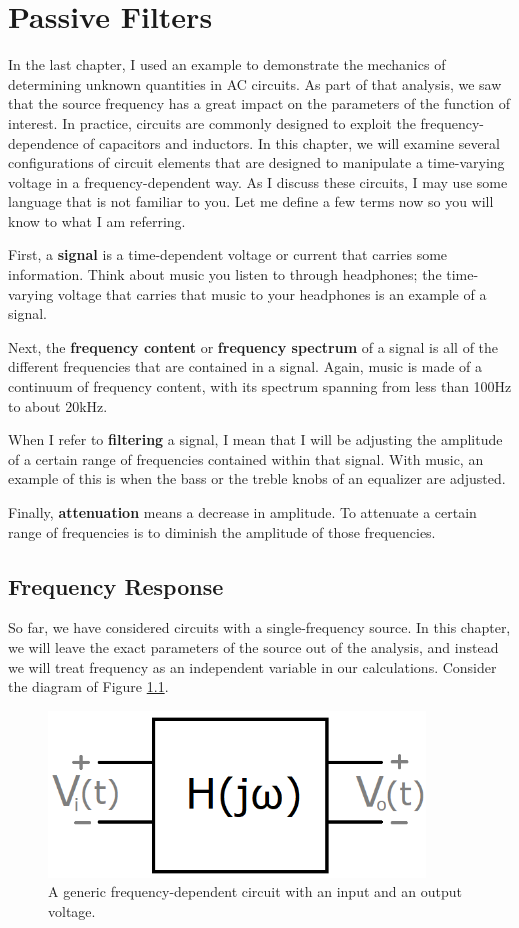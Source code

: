 \chapter{Passive Filters}
In the last chapter, I used an example to demonstrate the mechanics of determining unknown quantities in AC circuits. As part of that analysis, we saw that the source frequency has a great impact on the parameters of the function of interest. In practice, circuits are commonly designed to exploit the frequency-dependence of capacitors and inductors. In this chapter, we will examine several configurations of circuit elements that are designed to manipulate a time-varying voltage in a frequency-dependent way. As I discuss these circuits, I may use some language that is not familiar to you. Let me define a few terms now so you will know to what I am referring. 
\par
First, a \textbf{signal} is a time-dependent voltage or current that carries some information. Think about music you listen to through headphones; the time-varying voltage that carries that music to your headphones is an example of a signal.
\par
Next, the \textbf{frequency content} or \textbf{frequency spectrum} of a signal is all of the different frequencies that are contained in a signal. Again, music is made of a continuum of frequency content, with its spectrum spanning from less than 100Hz to about 20kHz. 
\par
When I refer to \textbf{filtering} a signal, I mean that I will be adjusting the amplitude of a certain range of frequencies contained within that signal. With music, an example of this is when the bass or the treble knobs of an equalizer are adjusted. 
\par
Finally, \textbf{attenuation} means a decrease in amplitude. To attenuate a certain range of frequencies is to diminish the amplitude of those frequencies.

\section{Frequency Response}
So far, we have considered circuits with a single-frequency source. In this chapter, we will leave the exact parameters of the source out of the analysis, and instead we will treat frequency as an independent variable in our calculations. Consider the diagram of Figure \ref{inOutSignalBox}.

\begin{figure}[h!]
\centering
\includegraphics[width=10cm]{figures/signalInOutBox.png}
\caption{A generic frequency-dependent circuit with an input and an output voltage.}
\label{inOutSignalBox}
\end{figure}

